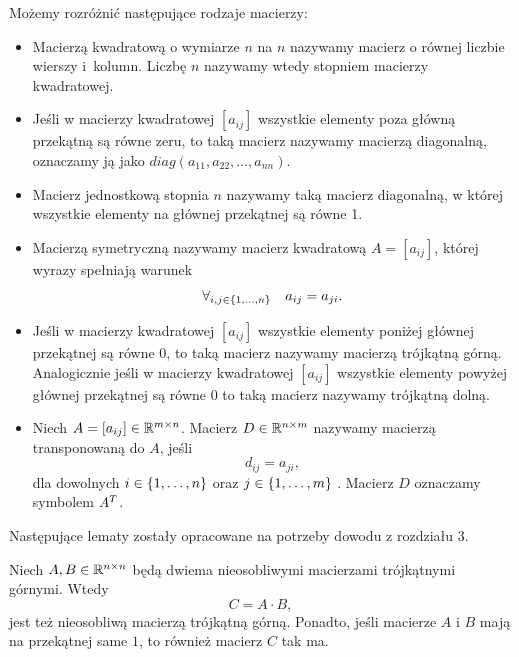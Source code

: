 \documentclass[12pt,a4paper]{report}
\newcommand{\mx}[1]{{#1}}
\begin{document}
\begin{definition} \label{definicja-macierzy}
Możemy rozróżnić następujące rodzaje macierzy:
\begin{itemize}
\item Macierzą kwadratową o wymiarze $n$ na $n$ nazywamy macierz o równej liczbie wierszy i~kolumn. Liczbę $n$ nazywamy wtedy stopniem macierzy kwadratowej.
\item Jeśli w macierzy kwadratowej $[a_{ij}]$ wszystkie elementy poza główną przekątną są równe zeru, to taką macierz nazywamy macierzą diagonalną, oznaczamy ją jako $diag(a_{11}, a_{22},\ldots,a_{nn})$.
\item Macierz jednostkową stopnia $n$ nazywamy taką macierz diagonalną, w której wszystkie elementy na głównej przekątnej są równe 1.
\item Macierzą symetryczną nazywamy macierz kwadratową $\mx{A}=[a_{ij}]$, której wyrazy spełniają warunek 
$$
\forall_{i,j \in \left\lbrace {1,\ldots,n} \right\rbrace} \quad a_{ij}=a_{ji}.
$$ 
\item Jeśli w macierzy kwadratowej $[a_{ij}]$ wszystkie elementy poniżej głównej przekątnej są równe $0$, to taką macierz nazywamy macierzą trójkątną górną.
Analogicznie jeśli w macierzy kwadratowej $[a_{ij}]$ wszystkie elementy powyżej głównej przekątnej są równe $0$ to taką macierz nazywamy trójkątną dolną.
\item Niech $\mx{A}=[a_{ij}] \in \setR^{m \times n}$. Macierz $D \in \mathbb{R}^{n \times m}$ nazywamy macierzą transponowaną do $A$, jeśli
$$
d_{ij} = a_{ji},
$$
dla dowolnych $i \in \left\lbrace {1,\ldots, n} \right\rbrace$ oraz $j \in \left\lbrace {1,\ldots,m} \right\rbrace$ . Macierz $D$ oznaczamy symbolem ${A}^T$.
\end{itemize}

\end{definition}
Następujące lematy zostały opracowane na potrzeby dowodu z rozdziału 3.
\begin{lemma} \label{lemma-upper-triangle-multiplication}
Niech $\mx{A}, \mx{B} \in \setR^{n \times n}$ będą dwiema nieosobliwymi macierzami trójkątnymi górnymi. Wtedy
$$
\mx{C} = \mx{A} \cdot \mx{B},
$$
jest też nieosobliwą macierzą trójkątną górną. Ponadto, jeśli macierze $\mx{A}$ i $\mx{B}$ mają na przekątnej same $1$, to również macierz $\mx{C}$ tak ma.
\end{lemma}
\end{document}
